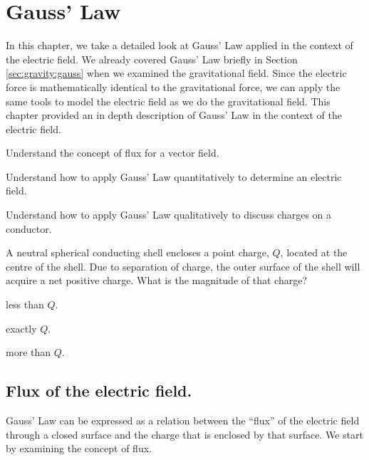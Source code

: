 
\chapter{Gauss' Law}
\label{chapter:gauss}
In this chapter, we take a detailed look at Gauss' Law applied in the context of the electric field. We already covered Gauss' Law briefly in Section \ref{sec:gravity:gauss} when we examined the gravitational field. Since the electric force is mathematically identical to the gravitational force, we can apply the same tools to model the electric field as we do the gravitational field. This chapter provided an in depth description of Gauss' Law in the context of the electric field. 

\begin{learningObjectives}{
 \item Understand the concept of flux for a vector field.
 \item Understand how to apply Gauss' Law quantitatively to determine an electric field.
 \item Understand how to apply Gauss' Law qualitatively to discuss charges on a conductor.
 }
\end{learningObjectives}

\begin{opening}
\begin{MCquestion}{A neutral spherical conducting shell encloses a point charge, $Q$, located at the centre of the shell. Due to separation of charge, the outer surface of the shell will acquire a net positive charge. What is the magnitude of that charge? }
\item less than $Q$.
\item exactly $Q$. \correct
\item more than $Q$.
\end{MCquestion}
\end{opening}

\section{Flux of the electric field.}
Gauss' Law can be expressed as a relation between the ``flux'' of the electric field through a closed surface and the charge that is enclosed by that surface. We start by examining the concept of flux. 

